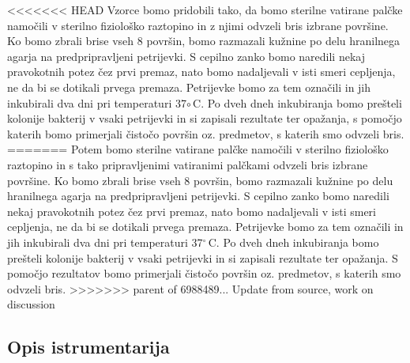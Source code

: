\documentclass[12pt, a4paper, oneside]{report}
\begin{document}
<<<<<<< HEAD
Vzorce bomo pridobili tako, da bomo sterilne vatirane palčke namočili v sterilno fiziološko raztopino in z njimi odvzeli bris izbrane površine. Ko bomo zbrali brise vseh 8 površin, bomo razmazali kužnine po delu hranilnega agarja na predpripravljeni petrijevki. S cepilno zanko bomo naredili nekaj pravokotnih potez čez prvi premaz, nato bomo nadaljevali v isti smeri cepljenja, ne da bi se dotikali prvega premaza. Petrijevke bomo za tem označili in jih inkubirali dva dni pri temperaturi 37$\circ$\,C. Po dveh dneh inkubiranja bomo prešteli kolonije bakterij v vsaki petrijevki in si zapisali rezultate ter opažanja, s pomočjo katerih bomo primerjali čistočo površin oz. predmetov, s katerih smo odvzeli bris.
=======
Potem bomo sterilne vatirane palčke namočili v sterilno fiziološko raztopino in s tako pripravljenimi vatiranimi palčkami odvzeli bris izbrane površine. Ko bomo zbrali brise vseh 8 površin, bomo razmazali kužnine po delu hranilnega agarja na predpripravljeni petrijevki. S cepilno zanko bomo naredili nekaj pravokotnih potez čez prvi premaz, nato bomo nadaljevali v isti smeri cepljenja, ne da bi se dotikali prvega premaza. Petrijevke bomo za tem označili in jih inkubirali dva dni pri temperaturi 37$^\circ$\,C. Po dveh dneh inkubiranja bomo prešteli kolonije bakterij v vsaki petrijevki in si zapisali rezultate ter opažanja. S pomočjo rezultatov bomo primerjali čistočo površin oz. predmetov, s katerih smo odvzeli bris.
>>>>>>> parent of 6988489... Update from source, work on discussion

\subsection{Opis istrumentarija}
\end{document}
